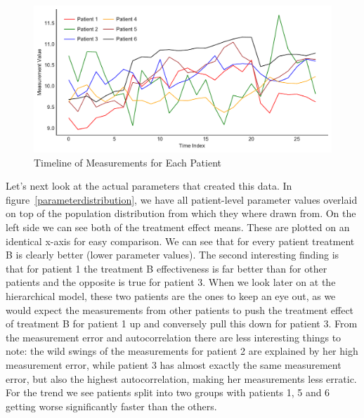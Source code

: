 \documentclass[12pt,a4paper,leqno]{report}
\theoremstyle{plain}
\theoremstyle{definition}
\theoremstyle{remark}
\begin{document}
\begin{figure}[H]
    \caption{Timeline of Measurements for Each Patient}\label{measurementtimeline}
    \bigskip
    \includegraphics[width=\textwidth,height=\textheight,keepaspectratio]{measurements_timeline.pdf}
\end{figure}

Let's next look at the actual parameters that created this data.
In figure\ \ref{parameterdistribution}, we have all patient-level parameter values
overlaid on top of the population
distribution from which they where drawn from. On the left side we can see both of the
treatment effect means. These are plotted on an identical x-axis for easy comparison.
We can see that for every patient treatment B is clearly
better (lower parameter values). The second interesting finding is that for patient
1 the treatment B effectiveness is far better than for other patients and the opposite
is true for patient 3. When we look later on at
the hierarchical model, these two patients are the ones to keep an eye out, as we would
expect the measurements from other patients to push the treatment effect of
treatment B for patient 1 up and conversely pull this down for patient
3. From the measurement error and autocorrelation there are less interesting things to
note: the wild swings of the measurements for patient 2
are explained by her high measurement error, while patient 3 has almost exactly the same
measurement error, but also the highest autocorrelation, making her measurements less
erratic. For the trend we see patients split into two groups with patients 1, 5 and 6 getting
worse significantly faster than the others.
\end{document}
